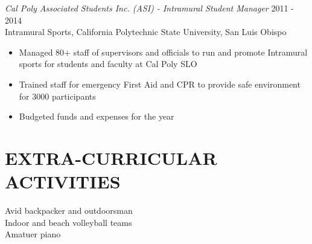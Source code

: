 \documentclass[line,margin]{res}
\begin{document}
\begin{resume}
                {\sl Cal Poly Associated Students Inc. (ASI) - Intramural Student Manager} \hfill 2011 - 2014 \\
                Intramural Sports, California Polytechnic State University, San Luis Obispo
                 \begin{itemize}  \itemsep -2pt %
                 \item Managed 80+ staff of supervisors and officials to run and promote Intramural sports for students and faculty at Cal Poly SLO
                 \item Trained staff for emergency First Aid and CPR to provide safe environment for 3000 participants
                 \item Budgeted funds and expenses for the year
                 \end{itemize} 
 

\section{EXTRA-CURRICULAR \\ ACTIVITIES}             
            Avid backpacker and outdoorsman \\
            Indoor and beach volleyball teams \\
            Amatuer piano
 

\end{resume}
\end{document}
